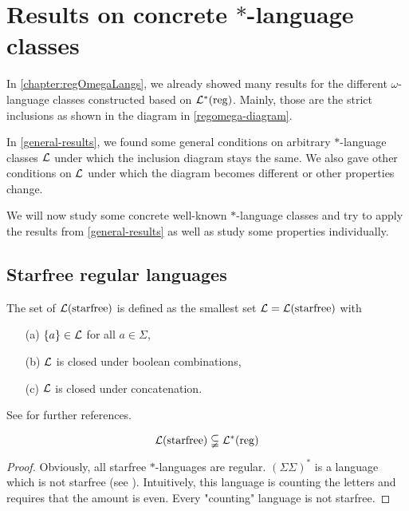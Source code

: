 \section{Results on concrete $*$-language classes}
\label{concrete-results}

In \cref{chapter:regOmegaLangs}, we already showed many results for the different $\omega$-language classes constructed based on $\mathcal{L}^*(\textup{\textrm{reg}})$. Mainly, those are the strict inclusions as shown in the diagram in \cref{regomega-diagram}.

In \cref{general-results}, we found some general conditions on arbitrary $*$-language classes $\mathcal{L}$ under which the inclusion diagram stays the same. We also gave other conditions on $\mathcal{L}$ under which the diagram becomes different or other properties change.

We will now study some concrete well-known $*$-language classes and try to apply the results from \cref{general-results} as well as study some properties individually.



\subsection{Starfree regular languages}
\label{lang:starfree}
The set of  $\mathcal{L}(\textup{\textrm{starfree}})$ is defined as the smallest set $\mathcal{L} = \mathcal{L}(\textup{\textrm{starfree}})$ with
\begin{itemize}
\item[(a)] $\Set{a} \in \Lang$ for all $a \in \Sigma$,
\item[(b)] $\mathcal{L}$ is closed under boolean combinations,
\item[(c)] $\mathcal{L}$ is closed under concatenation.
\end{itemize}
See \cite[Section 2.2]{ConcHierR104} for further references.

\begin{lemma}
\[ \mathcal{L}(\textup{\textrm{starfree}}) \subsetneqq \mathcal{L}^*(\textup{\textrm{reg}}) \]
\begin{proof}
Obviously, all starfree $*$-languages are regular. $(\Sigma\Sigma)^*$ is a language which is not starfree (see \cite[IV.2.1]{FinAutLogR109}). Intuitively, this language is counting the letters and requires that the amount is even. Every "counting" language is not starfree.
\end{proof}
\end{lemma}

